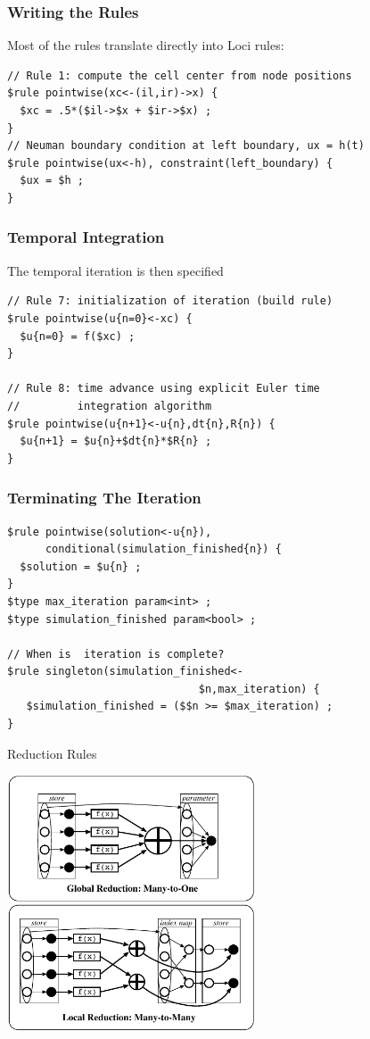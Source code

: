 \documentclass{beamer}
\begin{document}
\begin{frame}[fragile=singleslide]\frametitle{Writing the Rules}
Most of the rules translate directly into Loci rules:
\begin{verbatim}
// Rule 1: compute the cell center from node positions
$rule pointwise(xc<-(il,ir)->x) {
  $xc = .5*($il->$x + $ir->$x) ;
}
// Neuman boundary condition at left boundary, ux = h(t)
$rule pointwise(ux<-h), constraint(left_boundary) {
  $ux = $h ;
}
\end{verbatim}
\end{frame}
\begin{frame}[fragile=singleslide]\frametitle{Temporal Integration}
The temporal iteration is then specified
\begin{verbatim}
// Rule 7: initialization of iteration (build rule)
$rule pointwise(u{n=0}<-xc) {
  $u{n=0} = f($xc) ;
}

// Rule 8: time advance using explicit Euler time 
//         integration algorithm
$rule pointwise(u{n+1}<-u{n},dt{n},R{n}) {
  $u{n+1} = $u{n}+$dt{n}*$R{n} ;
}
\end{verbatim}
\end{frame}
\begin{frame}[fragile=singleslide]\frametitle{Terminating The Iteration}
\begin{verbatim}
$rule pointwise(solution<-u{n}),
      conditional(simulation_finished{n}) {
  $solution = $u{n} ;
}
$type max_iteration param<int> ;
$type simulation_finished param<bool> ;

// When is  iteration is complete?
$rule singleton(simulation_finished<-
                              $n,max_iteration) {
   $simulation_finished = ($$n >= $max_iteration) ;
}
\end{verbatim}
\end{frame}

\begin{frame}{Reduction Rules}
\begin{center}
\includegraphics[height=3in]{reduction}
\end{center}
\end{frame}
\end{document}
